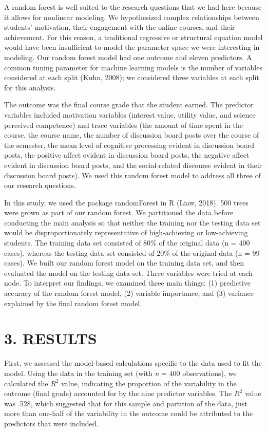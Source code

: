 \documentclass[acmart]{apa6}
\theoremstyle{definition}
\theoremstyle{definition}
\theoremstyle{definition}
\theoremstyle{remark}
\begin{document}
A random forest is well suited to the research questions that we had
here because it allows for nonlinear modeling. We hypothesized complex
relationships between students' motivation, their engagement with the
online courses, and their achievement. For this reason, a traditional
regressive or structural equation model would have been insufficient to
model the parameter space we were interesting in modeling. Our random
forest model had one outcome and eleven predictors. A common tuning
parameter for machine learning models is the number of variables
considered at each split (Kuhn, 2008); we considered three variables at
each split for this analysis.

The outcome was the final course grade that the student earned. The
predictor variables included motivation variables (interest value,
utility value, and science perceived competence) and trace variables
(the amount of time spent in the course, the course name, the number of
discussion board posts over the course of the semester, the mean level
of cognitive processing evident in discussion board posts, the positive
affect evident in discussion board posts, the negative affect evident in
discussion board posts, and the social-related discourse evident in
their discussion board posts). We used this random forest model to
address all three of our research questions.

In this study, we used the package randomForest in R (Liaw, 2018). 500
trees were grown as part of our random forest. We partitioned the data
before conducting the main analysis so that neither the training nor the
testing data set would be disproportionately representative of
high-achieving or low-achieving students. The training data set
consisted of 80\% of the original data (n = 400 cases), whereas the
testing data set consisted of 20\% of the original data (n = 99 cases).
We built our random forest model on the training data set, and then
evaluated the model on the testing data set. Three variables were tried
at each node. To interpret our findings, we examined three main things:
(1) predictive accuracy of the random forest model, (2) variable
importance, and (3) variance explained by the final random forest model.

\section{3. RESULTS}\label{results}

First, we assessed the model-based calculations specific to the data
used to fit the model. Using the data in the training set (with \emph{n}
= 400 observations), we calculated the \(R^2\) value, indicating the
proportion of the variability in the outcome (final grade) accounted for
by the nine predictor variables. The \(R^2\) value was .528, which
suggested that for this sample and partition of the data, just more than
one-half of the variability in the outcome could be attributed to the
predictors that were included.
\end{document}
